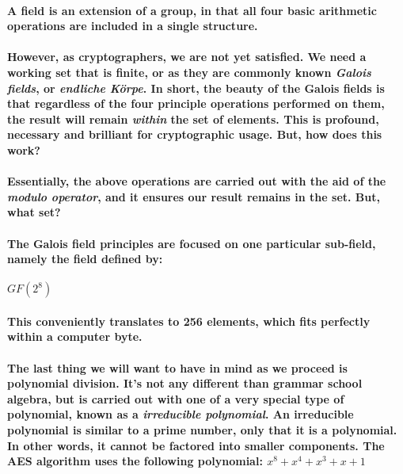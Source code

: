 \paragraph{A field is an extension of a group, in that all four basic arithmetic operations are included in a single structure.}\cite[p. 92]{PaarPelzl} 

\paragraph{However, as cryptographers, we are not yet satisfied. We need a working set that is finite, or as they are commonly known \emph{Galois fields}, or \emph{endliche Körpe}. In short, the beauty of the Galois fields is that regardless of the four principle operations performed on them, the result will remain \emph{within} the set of elements. This is profound, necessary and brilliant for cryptographic usage. But, how does this work?} \cite [Website]{PaarYoutube}

\paragraph{Essentially, the above operations are carried out with the aid of the \emph{modulo operator}, and it ensures our result remains in the set. But, what set?}

\paragraph{The Galois field principles are focused on one particular sub-field, namely the field defined by:}

$GF(2^8)$

\paragraph{This conveniently translates to 256 elements, which fits perfectly within a computer byte.}

\paragraph{The last thing we will want to have in mind as we proceed is polynomial division. It's not any different than grammar school algebra, but is carried out with one of a very special type of polynomial, known as a \emph{irreducible polynomial}. An irreducible polynomial is similar to a prime number, only that it is a polynomial. In other words, it cannot be factored into smaller components. The AES algorithm uses the following polynomial: $x^8 + x^4 + x^3 + x + 1$}\cite[p.21]{DelfsKnebl}

